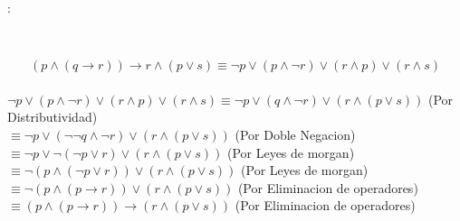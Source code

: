 \documentclass{report}%
\begin{document}
\newpage
\parindent=0mm:
\thispagestyle{plain}

\\

{\small 

$$
(p\wedge (q\rightarrow r))\rightarrow r\wedge (p\vee s) \equiv \neg p \vee (p\wedge \neg r)\vee (r\wedge p) \vee (r\wedge s)
$$\\

$\neg p \vee (p\wedge \neg r)\vee (r\wedge p) \vee (r\wedge s) \equiv \neg p \vee (q\wedge \neg r) \vee (r\wedge (p\vee s))$ (Por Distributividad)\\
$\equiv \neg p \vee (\neg \neg q\wedge \neg r) \vee (r\wedge (p\vee s))$ (Por Doble Negacion)\\
$\equiv \neg p \vee \neg (\neg p\vee r) \vee (r\wedge (p\vee s))$ (Por Leyes de morgan)\\
$\equiv \neg (p \wedge (\neg p\vee r)) \vee (r\wedge (p\vee s))$ (Por Leyes de morgan)\\
$\equiv \neg (p \wedge (p\rightarrow r)) \vee (r\wedge (p\vee s))$ (Por Eliminacion de operadores)\\
$\equiv (p \wedge (p\rightarrow r)) \rightarrow (r\wedge (p\vee s))$ (Por Eliminacion de operadores)\\


}\\
\end{document}
